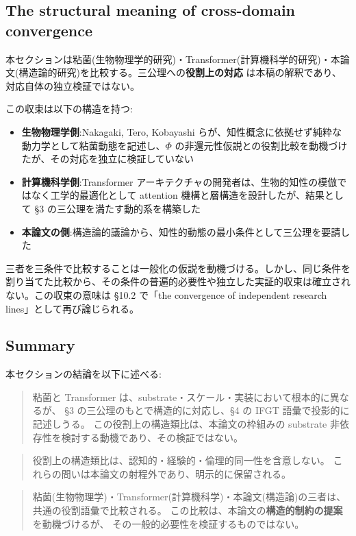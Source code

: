 \subsection{The structural meaning of cross-domain convergence}


本セクションは粘菌(生物物理学的研究)・Transformer(計算機科学的研究)・本論文(構造論的研究)を比較する。三公理への\textbf{役割上の対応} は本稿の解釈であり、対応自体の独立検証ではない。

この収束は以下の構造を持つ:

\begin{itemize}
\item \textbf{生物物理学側}:Nakagaki, Tero, Kobayashi らが、知性概念に依拠せず純粋な動力学として粘菌動態を記述し、$\Phi$ の非還元性仮説との役割比較を動機づけたが、その対応を独立に検証していない
\item \textbf{計算機科学側}:Transformer アーキテクチャの開発者は、生物的知性の模倣ではなく工学的最適化として attention 機構と層構造を設計したが、結果として \S{}3 の三公理を満たす動的系を構築した
\item \textbf{本論文の側}:構造論的議論から、知性的動態の最小条件として三公理を要請した
\end{itemize}

三者を三条件で比較することは一般化の仮説を動機づける。しかし、同じ条件を割り当てた比較から、その条件の普遍的必要性や独立した実証的収束は確立されない。この収束の意味は \S{}10.2 で「the convergence of independent research lines」として再び論じられる。

\subsection{Summary}


本セクションの結論を以下に述べる:

\begin{quote}
粘菌と Transformer は、substrate・スケール・実装において根本的に異なるが、
\S{}3 の三公理のもとで構造的に対応し、\S{}4 の IFGT 語彙で投影的に記述しうる。
この役割上の構造類比は、本論文の枠組みの substrate 非依存性を検討する動機であり、その検証ではない。
\end{quote}

\begin{quote}
役割上の構造類比は、認知的・経験的・倫理的同一性を含意しない。
これらの問いは本論文の射程外であり、明示的に保留される。
\end{quote}

\begin{quote}
粘菌(生物物理学)・Transformer(計算機科学)・本論文(構造論)の三者は、
共通の役割語彙で比較される。
この比較は、本論文の\textbf{構造的制約の提案}を動機づけるが、
その一般的必要性を検証するものではない。
\end{quote}

